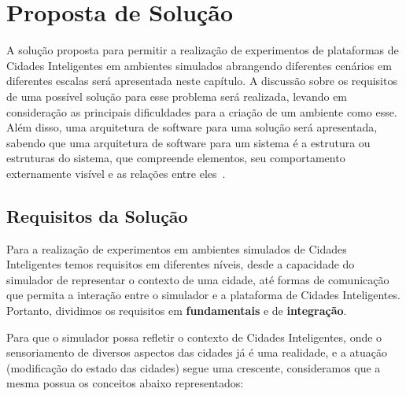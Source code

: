 \chapter{Proposta de Solução}
\label{cap:proposta}

A solução proposta para permitir a realização de experimentos de plataformas de Cidades Inteligentes em ambientes simulados abrangendo diferentes cenários em diferentes escalas será
apresentada neste capítulo.
A discussão sobre os requisitos de uma possível solução para esse problema será realizada, levando em consideração as principais dificuldades para a criação de um ambiente como esse.
Além disso, uma arquitetura de software para uma solução será apresentada, sabendo que uma arquitetura de software para um sistema é a estrutura ou estruturas do sistema, que compreende elementos,
seu comportamento externamente visível e as relações entre eles~\cite{clements_2002}.

\section{Requisitos da Solução}
\label{sec:requisitos}

Para a realização de experimentos em ambientes simulados de Cidades Inteligentes temos requisitos em diferentes níveis, desde a capacidade do simulador de representar o contexto
de uma cidade, até formas de comunicação que permita a interação entre o simulador e a plataforma de Cidades Inteligentes.
Portanto, dividimos os requisitos em \textbf{fundamentais} e de \textbf{integração}.

Para que o simulador possa refletir o contexto de Cidades Inteligentes, onde o sensoriamento de diversos aspectos das cidades já é uma realidade, e a atuação (modificação do estado
das cidades) segue uma crescente, consideramos que a mesma possua os conceitos abaixo representados:

